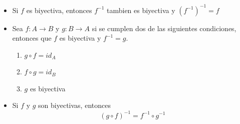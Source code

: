 \documentclass[letterpaper,11pt]{article}
\theoremstyle{plain}
\begin{document}
\begin{framed}
\begin{multicols}{2}
\begin{itemize}
                \item Si $f$ es biyectiva, entonces $f^{-1}$ tambien es biyectiva y $(f^{-1})^{-1}=f$
    
                \item Sea $f:A \to B$ y $g:B \to A$ si se cumplen dos de las siguientes condiciones, entonces  que $f$ es biyectiva y $f^{-1}=g$.
                    \begin{enumerate}
                        \item $g \circ f=id_A$
                        \item $f \circ g=id_B$
                        \item $g$ es biyectiva
                    \end{enumerate}
                
                \item Si $f$ y $g$ son biyectivas, entonces $$ (g \circ f)^{-1}=f^{-1} \circ g^{-1} $$
                
                
            \end{itemize}
        \end{multicols}
\end{framed}
\end{document}
